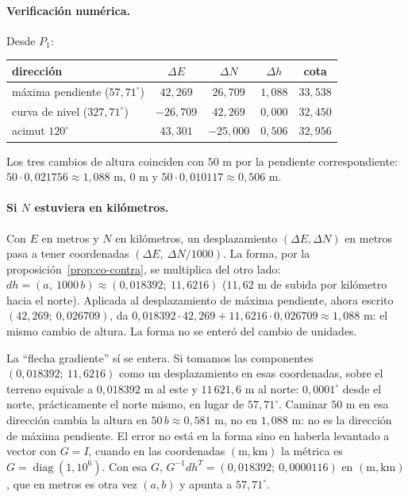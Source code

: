 \paragraph{Verificación numérica.} Desde \(P_1\):
\begin{center}
\begin{tabular}{lcccc}
dirección & \(\Delta E\) & \(\Delta N\) & \(\Delta h\) & cota\\\hline
máxima pendiente (\(57{,}71^\circ\)) & \(42{,}269\) & \(26{,}709\) & \(1{,}088\) & \(33{,}538\)\\
curva de nivel (\(327{,}71^\circ\)) & \(-26{,}709\) & \(42{,}269\) & \(0{,}000\) & \(32{,}450\)\\
acimut \(120^\circ\) & \(43{,}301\) & \(-25{,}000\) & \(0{,}506\) & \(32{,}956\)
\end{tabular}
\end{center}
Los tres cambios de altura coinciden con \(50\) m por la pendiente correspondiente:
\(50\cdot0{,}021756\approx1{,}088\) m, \(0\) m y \(50\cdot0{,}010117\approx0{,}506\) m.

\paragraph{Si \(N\) estuviera en kilómetros.} Con \(E\) en metros y \(N\) en kilómetros, un
desplazamiento \((\Delta E,\Delta N)\) en metros pasa a tener coordenadas
\((\Delta E,\ \Delta N/1000)\). La forma, por la proposición~\ref{prop:co-contra}, se
multiplica del otro lado: \(dh=(a,\ 1000\,b)\approx(0{,}018392;\ 11{,}6216)\) (\(11{,}62\) m
de subida por kilómetro hacia el norte). Aplicada al desplazamiento de máxima pendiente, ahora
escrito \((42{,}269;\ 0{,}026709)\), da
\(0{,}018392\cdot42{,}269+11{,}6216\cdot0{,}026709\approx1{,}088\) m: el mismo cambio de
altura. La forma no se enteró del cambio de unidades.

La \enquote{flecha gradiente} sí se entera. Si tomamos las componentes
\((0{,}018392;\ 11{,}6216)\) como un desplazamiento en esas coordenadas, sobre el terreno
equivale a \(0{,}018392\) m al este y \(11\,621{,}6\) m al norte: \(0{,}0001^\circ\) desde el norte,
prácticamente el norte mismo, en lugar de \(57{,}71^\circ\). Caminar \(50\) m en esa dirección
cambia la altura en \(50\,b\approx0{,}581\) m, no en \(1{,}088\) m: no es la dirección de
máxima pendiente. El error no está en la forma sino en haberla levantado a vector con
\(G=I\), cuando en las coordenadas \((\text{m},\text{km})\) la métrica es
\(G=\operatorname{diag}(1,10^6)\). Con esa \(G\), \(G^{-1}dh^T=(0{,}018392;\
0{,}0000116)\) en \((\text{m},\text{km})\), que en metros es otra vez \((a,b)\) y apunta a
\(57{,}71^\circ\).

